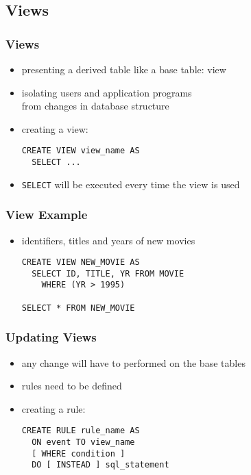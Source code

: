 \documentclass[dvipsnames]{beamer}
\theoremstyle{plain}
\begin{document}
\subsection{Views}

\begin{frame}[fragile]
  \frametitle{Views}

  \begin{itemize}
    \item presenting a derived table like a base table: \alert{view}
    \item isolating users and application programs\\
      from changes in database structure

    \pause
    \bigskip
    \item creating a view:
    \begin{lstlisting}
CREATE VIEW view_name AS
  SELECT ...
    \end{lstlisting}

    \medskip
    \item \lstinline!SELECT! will be executed every time the view is used
  \end{itemize}
\end{frame}

\begin{frame}[fragile]
  \frametitle{View Example}

  \begin{itemize}
    \item identifiers, titles and years of new movies

    \medskip
    \begin{lstlisting}
CREATE VIEW NEW_MOVIE AS
  SELECT ID, TITLE, YR FROM MOVIE
    WHERE (YR > 1995)

SELECT * FROM NEW_MOVIE
    \end{lstlisting}
  \end{itemize}
\end{frame}

\begin{frame}[fragile]
  \frametitle{Updating Views}

  \begin{itemize}
    \item any change will have to performed on the base tables
    \item rules need to be defined

    \pause
    \bigskip
    \item creating a rule:
    \begin{lstlisting}
CREATE RULE rule_name AS
  ON event TO view_name
  [ WHERE condition ]
  DO [ INSTEAD ] sql_statement
    \end{lstlisting}
  \end{itemize}
\end{frame}
\end{document}
